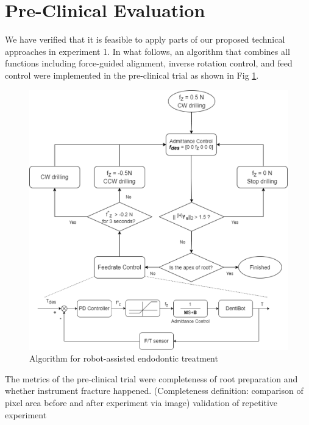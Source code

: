 \newpage

\section{Pre-Clinical Evaluation}
\hspace*{6mm}We have verified that it is feasible to apply parts of our proposed technical approaches in experiment 1. In what follows, an algorithm that combines all functions including force-guided alignment, inverse rotation control, and feed control were implemented in the pre-clinical trial as shown in Fig \ref{fig: exp2_motion planning}.
\begin{figure}[htbp]
\begin{center}
\includegraphics[width=1\linewidth]{Images/algorithm.png}
\end{center}
\caption{
Algorithm for robot-assisted endodontic treatment
}\label{fig: exp2_motion planning}
\end{figure}
\par
The metrics of the pre-clinical trial were completeness of root preparation and whether instrument fracture happened.
(Completeness definition: comparison of pixel area before and after experiment via image)
validation of repetitive experiment

